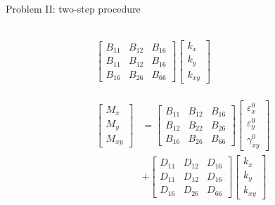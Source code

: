 \documentclass{beamer}
\begin{document}
\begin{frame}{Problem II: two-step procedure}
\begin{columns}[c]
\begin{column}{0.5\textwidth}
\begin{equation}
\begin{array}{l}
\begin{aligned}
			\begin{bmatrix}
				B_{11} & B_{12} & B_{16} \\
				B_{11} & B_{12} & B_{16} \\
				B_{16} & B_{26} & B_{66} 
			\end{bmatrix}
			\begin{bmatrix}
				k_x \\
				k_y \\
				k_{xy} 
			\end{bmatrix}  \\
		\end{aligned} \\ \\
		\begin{aligned}
			\begin{bmatrix}
				M_x \\
				M_y \\
				M_{xy}
			\end{bmatrix}
			&=
			\begin{bmatrix}
				B_{11} & B_{12} & B_{16} \\
				B_{12} & B_{22} & B_{26} \\
				B_{16} & B_{26} & B_{66} 
			\end{bmatrix}
			\begin{bmatrix}
				\varepsilon_x^0 \\
				\varepsilon_y^0 \\
				\gamma_{xy}^0
			\end{bmatrix} \\ 
			&+  
			\begin{bmatrix}
				D_{11} & D_{12} & D_{16} \\
				D_{11} & D_{12} & D_{16} \\
				D_{16} & D_{26} & D_{66} 
			\end{bmatrix}
			\begin{bmatrix}
				k_x \\
				k_y \\
				k_{xy} 
			\end{bmatrix}
		\end{aligned}
			\end{array}
		\end{equation}
	\end{column}
\end{columns}
\end{frame}
\end{document}
